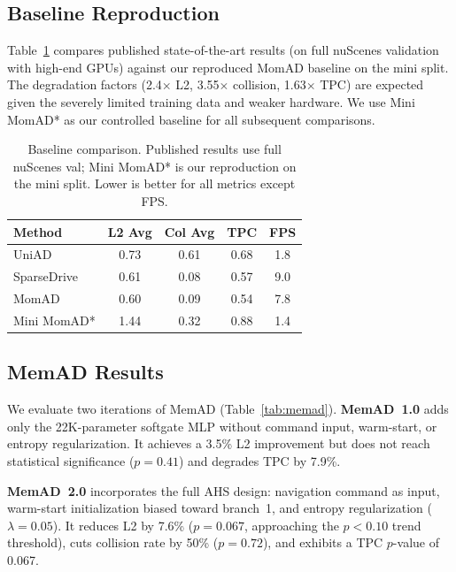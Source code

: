 \documentclass{article}
\begin{document}
\subsection{Baseline Reproduction}
\label{sec:baseline}

Table~\ref{tab:baseline} compares published state-of-the-art results (on full nuScenes validation with high-end GPUs) against our reproduced MomAD baseline on the mini split.
The degradation factors (2.4$\times$ L2, 3.55$\times$ collision, 1.63$\times$ TPC) are expected given the severely limited training data and weaker hardware.
We use Mini MomAD* as our controlled baseline for all subsequent comparisons.

\begin{table}[t]
\caption{Baseline comparison. Published results use full nuScenes val; Mini MomAD* is our reproduction on the mini split. Lower is better for all metrics except FPS.}
\label{tab:baseline}
\centering
\small
\begin{tabular}{@{}lcccc@{}}
\toprule
Method & L2 Avg & Col Avg & TPC & FPS \\
\midrule
UniAD & 0.73 & 0.61 & 0.68 & 1.8 \\
SparseDrive & 0.61 & 0.08 & 0.57 & 9.0 \\
MomAD & 0.60 & 0.09 & 0.54 & 7.8 \\
\midrule
Mini MomAD* & 1.44 & 0.32 & 0.88 & 1.4 \\
\bottomrule
\end{tabular}
\end{table}

\subsection{MemAD Results}
\label{sec:results}

We evaluate two iterations of MemAD (Table~\ref{tab:memad}).
\textbf{MemAD~1.0} adds only the 22K-parameter softgate MLP without command input, warm-start, or entropy regularization.
It achieves a 3.5\% L2 improvement but does not reach statistical significance ($p = 0.41$) and degrades TPC by 7.9\%.

\textbf{MemAD~2.0} incorporates the full AHS design: navigation command as input, warm-start initialization biased toward branch~1, and entropy regularization ($\lambda = 0.05$).
It reduces L2 by 7.6\% ($p = 0.067$, approaching the $p < 0.10$ trend threshold), cuts collision rate by 50\% ($p = 0.72$), and exhibits a TPC $p$-value of 0.067.
\end{document}
